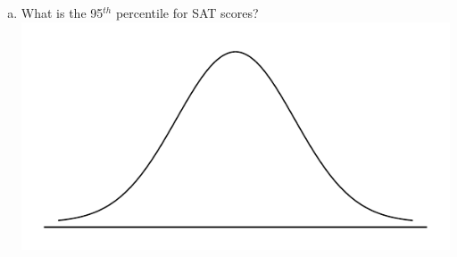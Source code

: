\documentclass[11pt]{article}\usepackage[]{graphicx}\usepackage[]{color}
\begin{document}
\begin{enumerate}[(a)]
\item What is the 95$^{th}$ percentile for SAT scores?\\
\includegraphics[scale=0.6]{figure/norm_draw.pdf}

\end{enumerate}
\end{document}

